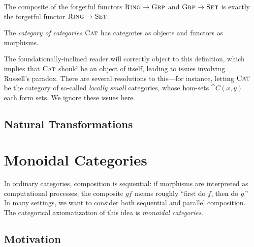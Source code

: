 \begin{ex}
  The composite of the forgetful functors ${\textsc{\text{Ring}}}\to{\textsc{\text{Grp}}}$ and
  ${\textsc{\text{Grp}}}\to{\textsc{\text{Set}}}$ is exactly the forgetful functor
  ${\textsc{\text{Ring}}}\to{\textsc{\text{Set}}}$.
\end{ex}

\begin{dfn}
  The \emph{category of categories} ${\textsc{\text{Cat}}}$ has categories as objects and
  functors as morphisms.
\end{dfn}

The foundationally-inclined reader will correctly object to this definition,
which implies that ${\textsc{\text{Cat}}}$ should be an object of itself, leading to issues
involving Russell's paradox. There are several resolutions to this---for
instance, letting ${\textsc{\text{Cat}}}$ be the category of so-called \emph{locally small}
categories, whose hom-sets $\cat{C}(x, y)$ each form sets. We ignore these
issues here.



\subsection{Natural Transformations}

\section{Monoidal Categories}

In ordinary categories, composition is sequential: if morphisms are interpreted
as computational processes, the composite $gf$ means roughly ``first do $f$,
then do $g$.'' In many settings, we want to consider both sequential and
parallel composition. The categorical axiomatization of this idea is
\emph{monoidal categories}.

\subsection{Motivation}

